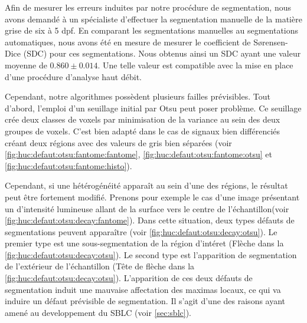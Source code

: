 \documentclass[\main/main.tex]{subfiles}
\begin{document}
Afin de mesurer les erreurs induites par notre procédure de segmentation, nous avons demandé à un spécialiste d'effectuer la segmentation manuelle de la matière grise de six \pzs{} à 5 dpf.
%
En comparant les segmentations manuelles au segmentations automatiques, nous avons été en mesure de mesurer le coefficient de S\o rensen-Dice (SDC) pour ces segmentations.
%
Nous obtenus ainsi un SDC ayant une valeur moyenne de $0.860 \pm{0.014}$.
%
Une telle valeur est compatible avec la mise en place d'une procédure d'analyse haut débit.

%
Cependant, notre algorithmes possèdent plusieurs failles prévisibles. Tout d'abord, l'emploi d'un seuillage initial par Otsu peut poser problème. Ce seuillage crée deux classes de voxels par minimisation de la variance au sein des deux groupes de voxels. C'est bien adapté dans le cas de signaux bien différenciés créant deux régions avec des valeurs de gris bien séparées
(voir \autoref{fig:huc:defaut:otsu:fantome:fantome},
\autoref{fig:huc:defaut:otsu:fantome:otsu}
et \autoref{fig:huc:defaut:otsu:fantome:histo}).

%
Cependant, si une hétérogénéité apparaît au sein d'une des régions, le résultat peut être fortement modifié.
%
Prenons pour exemple le cas d'une image présentant un d'intensité lumineuse allant de la surface vers le centre de l'échantillon(voir \autoref{fig:huc:defaut:otsu:decay:fantome}).
%
Dans cette situation, deux types défauts de segmentations peuvent apparaître (voir \autoref{fig:huc:defaut:otsu:decay:otsu}).
%
Le premier type est une sous-segmentation de la région d'intéret (Flèche dans la \autoref{fig:huc:defaut:otsu:decay:otsu}).
%
Le second type est l'apparition de segmentation de l'extérieur de l'échantillon (Tête de flèche dans la \autoref{fig:huc:defaut:otsu:decay:otsu}).
%
L'apparition de ces deux défauts de segmentation induit une mauvaise affectation des maximas locaux, ce qui va induire un défaut prévisible de segmentation.
%
Il s'agit d'une des raisons ayant amené au developpement du SBLC (voir \autoref{sec:sblc}). 
\end{document}
